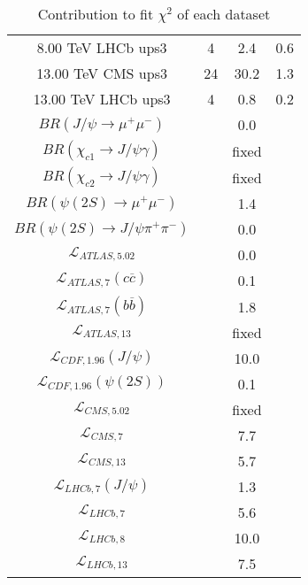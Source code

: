 \begin{table}[h!]
\begin{tabular}{c|c|c|c}
8.00 TeV LHCb ups3 & 4 & 2.4 & 0.6 \\
13.00 TeV CMS ups3 & 24 & 30.2 & 1.3 \\
13.00 TeV LHCb ups3 & 4 & 0.8 & 0.2 \\
\hline
$BR(J/\psi\rightarrow\mu^+\mu^-)$ &  & 0.0 &  \\
$BR(\chi_{c1}\rightarrow J/\psi\gamma)$ &  & fixed & \\
$BR(\chi_{c2}\rightarrow J/\psi\gamma)$ &  & fixed & \\
$BR(\psi(2S)\rightarrow\mu^+\mu^-)$ &  & 1.4 &  \\
$BR(\psi(2S)\rightarrow J/\psi\pi^+\pi^-)$ &  & 0.0 &  \\
$\mathcal L_{ATLAS,5.02}$ &  & 0.0 &  \\
$\mathcal L_{ATLAS,7}(c\overline c)$ &  & 0.1 &  \\
$\mathcal L_{ATLAS,7}(b\overline b)$ &  & 1.8 &  \\
$\mathcal L_{ATLAS,13}$ &  & fixed & \\
$\mathcal L_{CDF,1.96}(J/\psi)$ &  & 10.0 &  \\
$\mathcal L_{CDF,1.96}(\psi(2S))$ &  & 0.1 &  \\
$\mathcal L_{CMS,5.02}$ &  & fixed & \\
$\mathcal L_{CMS,7}$ &  & 7.7 &  \\
$\mathcal L_{CMS,13}$ &  & 5.7 &  \\
$\mathcal L_{LHCb,7}(J/\psi)$ &  & 1.3 &  \\
$\mathcal L_{LHCb,7}$ &  & 5.6 &  \\
$\mathcal L_{LHCb,8}$ &  & 10.0 &  \\
$\mathcal L_{LHCb,13}$ &  & 7.5 &  \\
\end{tabular}
\caption{Contribution to fit $\chi^2$ of each dataset}
\end{table}
